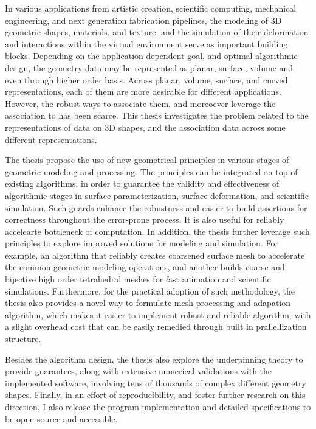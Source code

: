 In various applications from artistic creation, scientific computing, mechanical engineering, and next generation fabrication pipelines, 
the modeling of 3D geometric shapes, materials, and texture, and the simulation of their deformation and interactions within the virtual environment serve as important building blocks.
Depending on the application-dependent goal, and optimal algorithmic design, the geometry data may be represented as planar, surface, volume and even through higher order basis.
Across planar, volume, surface, and curved representations, each of them are more desirable for different applications. However, the robust ways to associate them, and moreoever leverage the association to has been scarce.
This thesis investigates the problem related to the representations of data on 3D shapes, and the association data across some different representations. 

The thesis propose the use of new geometrical principles in various stages of geometric modeling and processing. The principles can be integrated on top of existing algorithms, in order to guarantee the validity and effectiveness of algorithmic stages in surface parameterization, surface deformation, and scientific simulation.
Such guards enhance the robustness and easier to build assertions for correctness throughout the error-prone process. It is also useful for reliably accelearte bottleneck of computation. 
In addition, the thesis further leverage such principles to explore improved solutions for modeling and simulation. 
For example, an algorithm that reliably creates coarsened surface mesh to accelerate the common geometric modeling operations, and another builds coarse and bijective high order tetrahedral meshes for fast animation and scientific simulations.
Furthermore, for the practical adoption of such methodology, the thesis also provides a novel way to formulate mesh processing and adapation algorithm, which makes it easier to implement robust and reliable algorithm, with a slight overhead cost that can be easily remedied through built in prallellization structure.

Besides the algorithm design, the thesis also explore the underpinning theory to provide guarantees, along with extensive numerical validations with the implemented software, involving tens of thousands of complex different geometry shapes. Finally, in an effort of reproducibility, and foster further research on this direction, I also release the program implementation and detailed specifications to be open source and accessible.
